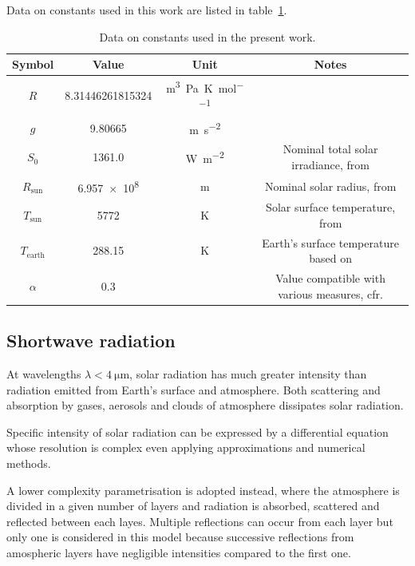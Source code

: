 \documentclass[a4paper,10pt,final,twocolumn]{article}
\begin{document}
Data on constants used in this work are listed in table~\ref{tab:constants}.
\begin{table}[h]
  \centering
  \caption{Data on constants used in the present work.}
  \label{tab:constants}
  \begin{tabular}[b]{cccc}
    \toprule
    Symbol           & Value                  & Unit                                           & Notes \\
    \midrule
    $R$              & \num{8.31446261815324} & \unit{\cubic\metre\pascal\per\kelvin\per\mole} &       \\
    $g$              & \num{9.80665}          & \unit{\metre\per\square\second}                &       \\
    $S_0$            & \num{1361.0}             & \unit{\watt\per\square\metre}                  & Nominal total solar irradiance, from \cite{IAU} \\
    $R_\text{sun}$ & \num{6.957e8}          & \unit{\metre}                                  & Nominal solar radius, from \cite{IAU} \\
    $T_\text{sun}$ & \num{5772} & \unit{\kelvin} & Solar surface temperature, from \cite{IAU} \\
    $T_\text{earth}$ & \num{288.15} & \unit{\kelvin} & Earth's surface temperature based on \cite{ISA} \\
    $\alpha$ & 0.3 & & Value compatible with various measures, cfr. \cite{albedo} \\
    \bottomrule
  \end{tabular}
\end{table}

\subsection{Shortwave radiation}
At wavelengths $\lambda < \qty{4}{\micro\metre}$, solar radiation has much greater intensity than radiation emitted from Earth's surface and atmosphere. Both scattering and absorption by gases, aerosols and clouds of atmosphere dissipates solar radiation.\cite[469]{ramanathan}

Specific intensity of solar radiation can be expressed by a differential equation whose resolution is complex even applying approximations and numerical methods.\cite[469]{ramanathan}

A lower complexity parametrisation is adopted instead, where the atmosphere is divided in a given number of layers and radiation is absorbed, scattered and reflected between each layes. Multiple reflections can occur from each layer but only one is considered in this model because successive reflections from amospheric layers have negligible intensities compared to the first one.\cite[470]{ramanathan}
\end{document}

